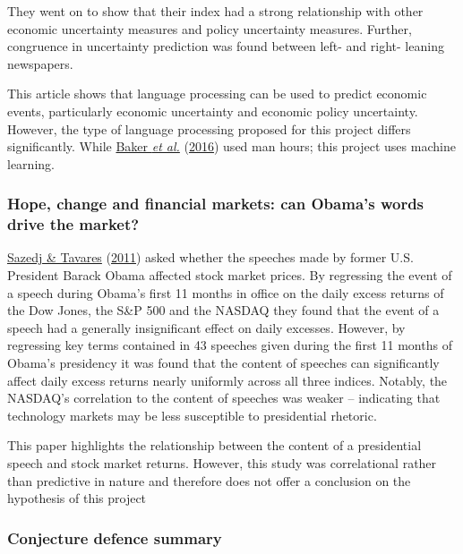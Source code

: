 \documentclass[11pt,preprint, authoryear]{elsarticle}
\numberwithin{equation}{section}
\numberwithin{figure}{section}
\numberwithin{table}{section}
\begin{document}
They went on to show that their index had a strong relationship with
other economic uncertainty measures and policy uncertainty measures.
Further, congruence in uncertainty prediction was found between left-
and right- leaning newspapers.

This article shows that language processing can be used to predict
economic events, particularly economic uncertainty and economic policy
uncertainty. However, the type of language processing proposed for this
project differs significantly. While
\protect\hyperlink{ref-baker2016measuring}{Baker \emph{et al.}}
(\protect\hyperlink{ref-baker2016measuring}{2016}) used man hours; this
project uses machine learning.

\hypertarget{hope-change-and-financial-markets-can-obamas-words-drive-the-market}{%
\subsubsection{\texorpdfstring{Hope, change and financial markets: can
Obama's words drive the market?
\label{Obama}}{Hope, change and financial markets: can Obama's words drive the market? }}\label{hope-change-and-financial-markets-can-obamas-words-drive-the-market}}

\protect\hyperlink{ref-sazedj2011hope}{Sazedj \& Tavares}
(\protect\hyperlink{ref-sazedj2011hope}{2011}) asked whether the
speeches made by former U.S. President Barack Obama affected stock
market prices. By regressing the event of a speech during Obama's first
11 months in office on the daily excess returns of the Dow Jones, the
S\&P 500 and the NASDAQ they found that the event of a speech had a
generally insignificant effect on daily excesses. However, by regressing
key terms contained in 43 speeches given during the first 11 months of
Obama's presidency it was found that the content of speeches can
significantly affect daily excess returns nearly uniformly across all
three indices. Notably, the NASDAQ's correlation to the content of
speeches was weaker -- indicating that technology markets may be less
susceptible to presidential rhetoric.

This paper highlights the relationship between the content of a
presidential speech and stock market returns. However, this study was
correlational rather than predictive in nature and therefore does not
offer a conclusion on the hypothesis of this project

\hypertarget{conjecture-defence-summary}{%
\subsubsection{\texorpdfstring{Conjecture defence summary
\label{defence summary}}{Conjecture defence summary }}\label{conjecture-defence-summary}}
\end{document}
